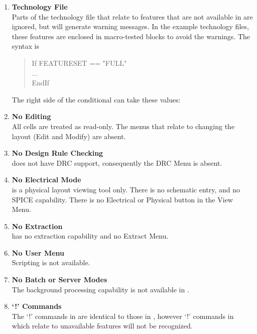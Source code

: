 \begin{enumerate}
\item{\bf Technology File}\\
Parts of the technology file that relate to features that are not
available in {\Xiv} are ignored, but will generate warning messages. 
In the example technology files, these features are enclosed in
macro-tested blocks to avoid the warnings.  The syntax is

\begin{quote}\vt
If FEATURESET == "FULL"\\
...\\
EndIf
\end{quote}

The right side of the conditional can take these values:


\item{\bf No Editing}\\
All cells are treated as read-only.  The menus that relate to changing
the layout ({\cb Edit} and {\cb Modify}) are absent.

\item{\bf No Design Rule Checking}\\
{\Xiv} does not have DRC support, consequently the {\cb DRC Menu} is
absent.

\item{\bf No Electrical Mode}\\
{\Xiv} is a physical layout viewing tool only.  There is no schematic
entry, and no SPICE capability.  There is no {\cb Electrical} or {\cb
Physical} button in the {\cb View Menu}.

\item{\bf No Extraction}\\
{\Xiv} has no extraction capability and no {\cb Extract Menu}.

\item{\bf No User Menu}\\
Scripting is not available.

\item{\bf No Batch or Server Modes}\\
The background processing capability is not available in {\Xiv}.

\item{\bf `!' Commands}\\
The `!' commands in {\Xiv} are identical to those in {\Xic}, however
`!' commands in {\Xiv} which relate to unavailable features will not
be recognized.
\end{enumerate}


